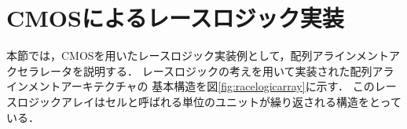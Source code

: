 \section{CMOSによるレースロジック実装}
本節では，CMOSを用いたレースロジック実装例として，配列アラインメントアクセラレータを説明する．
レースロジックの考えを用いて実装された配列アラインメントアーキテクチャの
基本構造を図\ref{fig:racelogicarray}に示す．
このレースロジックアレイはセルと呼ばれる単位のユニットが繰り返される構造をとっている．
\begin{figure}[t!]
\begin{center}

\end{center}
\end{figure}
